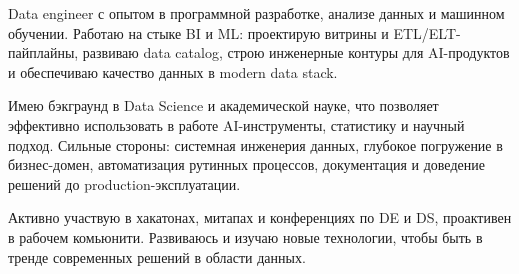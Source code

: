 

\begin{cvparagraph}

Data engineer с опытом в программной разработке, анализе данных и машинном обучении. Работаю на стыке BI и ML: проектирую витрины и ETL/ELT-пайплайны, развиваю data catalog, строю инженерные контуры для AI-продуктов и обеспечиваю качество данных в modern data stack.

Имею бэкграунд в Data Science и академической науке, что позволяет эффективно использовать в работе AI-инструменты, статистику и научный подход. Сильные стороны: системная инженерия данных, глубокое погружение в бизнес-домен, автоматизация рутинных процессов, документация и доведение решений до production-эксплуатации.

Активно участвую в хакатонах, митапах и конференциях по DE и DS, проактивен в рабочем комьюнити. Развиваюсь и изучаю новые технологии, чтобы быть в тренде современных решений в области данных.
\end{cvparagraph}
